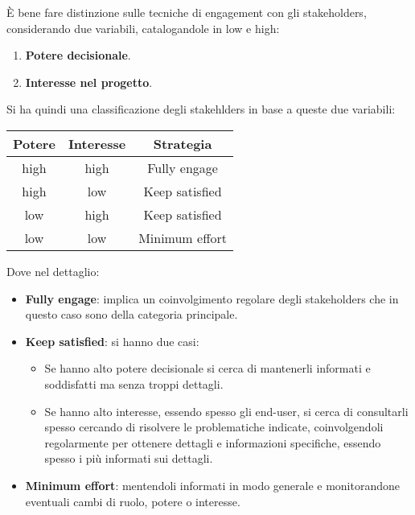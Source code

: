 È bene fare distinzione sulle tecniche di engagement con gli stakeholders, considerando due variabili, catalogandole in low e high: 
\begin{enumerate}
    \item \textbf{Potere decisionale}.
    \item \textbf{Interesse nel progetto}.
\end{enumerate}
Si ha quindi una classificazione degli stakehlders in base a queste due variabili:
\begin{table}[!ht]
  \centering
  \begin{tabular}{c|c|c}
    \textbf{Potere} & \textbf{Interesse} & \textbf{Strategia}\\\hline
    high & high & Fully engage\\
    high & low & Keep satisfied\\
    low & high & Keep satisfied\\
    low & low & Minimum effort
  \end{tabular}
\end{table}
Dove nel dettaglio:
\begin{itemize}
    \item \textbf{Fully engage}: implica un coinvolgimento regolare degli stakeholders che in questo caso sono della categoria principale.
    \item \textbf{Keep satisfied}: si hanno due casi:
    \begin{itemize}
        \item Se hanno alto potere decisionale si cerca di mantenerli informati e soddisfatti ma senza troppi dettagli.
        \item Se hanno alto interesse, essendo spesso gli end-user, si cerca di consultarli spesso cercando di risolvere le problematiche indicate, coinvolgendoli regolarmente per ottenere dettagli e informazioni specifiche, essendo spesso i più informati sui dettagli.
    \end{itemize}
    \item \textbf{Minimum effort}: mentendoli informati in modo generale e monitorandone eventuali cambi di ruolo, potere o interesse.
\end{itemize}

